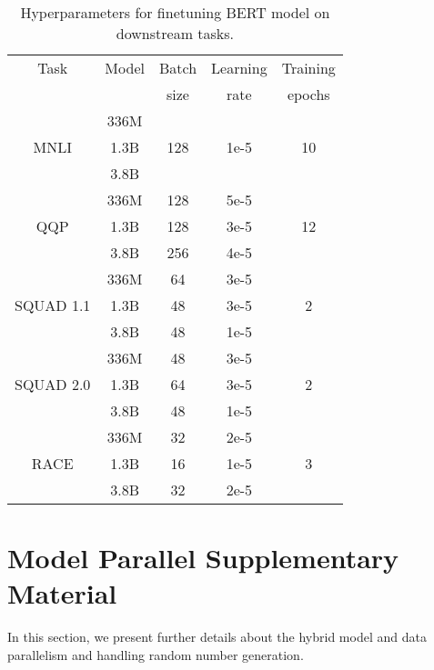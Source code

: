 \documentclass{article}
\begin{document}
\begin{table}[hbt!]
\footnotesize
\begin{center}
\caption{Hyperparameters for finetuning BERT model on downstream tasks.}
\label{tab:bert_tasks_hparams}
\begin{tabular}{c|c|c|c|c} \hline \hline
Task      & Model & Batch & Learning & Training \\
          &       & size  & rate     & epochs   \\ \hline
          & 336M  &       &          &          \\ 
MNLI      & 1.3B  & 128   & 1e-5     & 10       \\ 
          & 3.8B  &       &          &          \\ \hline 
          & 336M  &   128    & 5e-5     &          \\ 
QQP       & 1.3B  & 128   & 3e-5     & 12      \\ 
          & 3.8B  &  256     & 4e-5     &          \\ \hline 
          & 336M  & 64    & 3e-5     &          \\ 
SQUAD 1.1 & 1.3B  & 48    & 3e-5     & 2        \\ 
          & 3.8B  & 48    & 1e-5     &          \\ \hline 
          & 336M  & 48    & 3e-5     &          \\ 
SQUAD 2.0 & 1.3B  & 64    & 3e-5     & 2        \\ 
          & 3.8B  & 48    & 1e-5     &          \\ \hline 
          & 336M  & 32    & 2e-5     &          \\ 
RACE      & 1.3B  & 16   & 1e-5     & 3        \\ 
          & 3.8B  & 32    & 2e-5     &          \\ \hline 
\end{tabular}
\end{center}
\end{table}


\section{Model Parallel Supplementary Material }
\label{sec:modelpar:supp}

In this section, we present further details about the hybrid model and data parallelism and handling random number generation.
\end{document}
